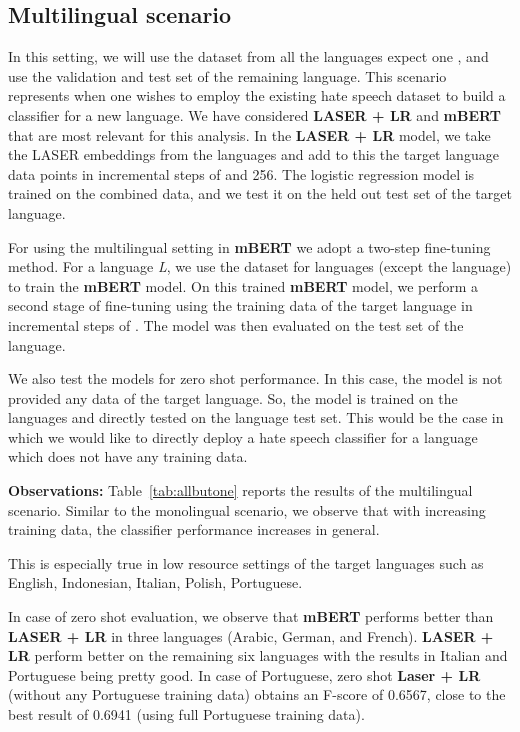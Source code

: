 \documentclass[runningheads]{llncs}
\begin{document}
\subsection{Multilingual scenario}
In this setting, we will use the dataset from all the languages expect one , and use the validation and test set of the remaining language. This scenario represents when one wishes to employ the existing hate speech dataset to build a classifier for a new language. We have considered \textbf{LASER + LR} and \textbf{mBERT} that are most relevant for this analysis.
In the \textbf{LASER + LR} model, we take the LASER embeddings from the  languages and add to this the target language data points in incremental steps of  and 256. The logistic regression model is trained on the combined data, and we test it on the held out test set of the target language. 

For using the multilingual setting in \textbf{mBERT} we adopt a two-step fine-tuning method. For a language \textit{L}, we use the dataset for  languages (except the  language) to train the \textbf{mBERT} model. On this trained \textbf{mBERT} model, we perform a second stage of fine-tuning using the training data of the target language in incremental steps of . The model was then evaluated on the test set of the  language.

We also test the models for zero shot performance. In this case, the model is not provided any data of the target language. So, the model is trained on the  languages and directly tested on the  language test set. This would be the case in which we would like to directly deploy a hate speech classifier for a language which does not have any training data.


\noindent\textbf{Observations:} Table~\ref{tab:allbutone} reports the results of the multilingual scenario. Similar to the monolingual scenario, we observe that with increasing training data, the classifier performance increases in general. 

This is especially true in low resource settings of the target languages such as English, Indonesian, Italian, Polish, Portuguese.

In case of zero shot evaluation, we observe that \textbf{mBERT} performs better than \textbf{LASER + LR} in three languages (Arabic, German, and French). \textbf{LASER + LR} perform better on the remaining six languages with the results in Italian and Portuguese being pretty good. In case of Portuguese, zero shot \textbf{Laser + LR} (without any Portuguese training data) obtains an F-score of 0.6567, close to the best result of 0.6941 (using full Portuguese training data).
\end{document}
